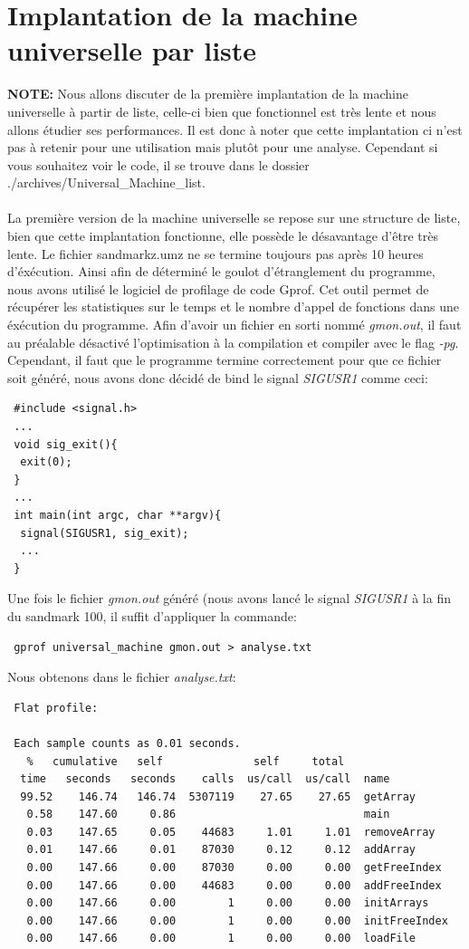 \documentclass[a4paper,12pt]{report}
\begin{document}
\section{Implantation de la machine universelle par liste}
\textbf{NOTE:} Nous allons discuter de la première implantation de la machine universelle à partir de liste, celle-ci bien que fonctionnel
est très lente et nous allons étudier ses performances. Il est donc à noter que cette implantation ci n'est pas à retenir pour une
utilisation mais plutôt pour une analyse. Cependant si vous souhaitez voir le code, il se trouve dans le dossier
./archives/Universal\_Machine\_list.
\\ \\
La première version de la machine universelle se repose sur une structure de liste, bien que cette implantation fonctionne, elle
possède le désavantage d'être très lente. Le fichier sandmarkz.umz ne se termine toujours pas après 10 heures d'éxécution.
Ainsi afin de déterminé le goulot d'étranglement du programme, nous avons utilisé le logiciel de profilage de code Gprof.
Cet outil permet de récupérer les statistiques sur le temps et le nombre d'appel de fonctions dans une éxécution du programme.
Afin d'avoir un fichier en sorti nommé \textit{gmon.out}, il faut au préalable désactivé l'optimisation à la compilation et compiler avec
le flag \textit{-pg}.
Cependant, il faut que le programme termine correctement pour que ce fichier soit généré, nous avons donc décidé de bind le signal 
\textit{SIGUSR1} comme ceci:
\begin{verbatim}
 #include <signal.h>
 ...
 void sig_exit(){
  exit(0);
 }
 ...
 int main(int argc, char **argv){
  signal(SIGUSR1, sig_exit);
  ...
 }
\end{verbatim}
Une fois le fichier \textit{gmon.out} généré (nous avons lancé le signal \textit{SIGUSR1} à la fin du sandmark 100, il suffit
d'appliquer la commande:
\begin{verbatim}
 gprof universal_machine gmon.out > analyse.txt
\end{verbatim}
Nous obtenons dans le fichier \textit{analyse.txt}:
\begin{verbatim}
 Flat profile:

 Each sample counts as 0.01 seconds.
   %   cumulative   self              self     total           
  time   seconds   seconds    calls  us/call  us/call  name    
  99.52    146.74   146.74  5307119    27.65    27.65  getArray
   0.58    147.60     0.86                             main
   0.03    147.65     0.05    44683     1.01     1.01  removeArray
   0.01    147.66     0.01    87030     0.12     0.12  addArray
   0.00    147.66     0.00    87030     0.00     0.00  getFreeIndex
   0.00    147.66     0.00    44683     0.00     0.00  addFreeIndex
   0.00    147.66     0.00        1     0.00     0.00  initArrays
   0.00    147.66     0.00        1     0.00     0.00  initFreeIndex
   0.00    147.66     0.00        1     0.00     0.00  loadFile
\end{verbatim}
\end{document}
